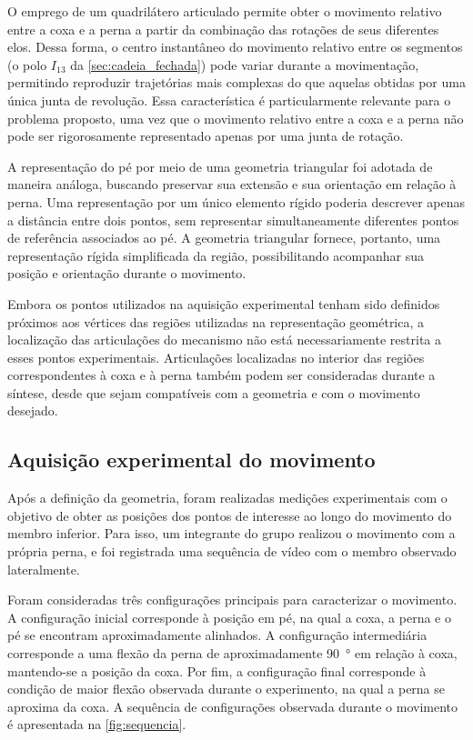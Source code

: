 \documentclass[12pt,a4paper,twoside]{article}
\numberwithin{equation}{section}
\begin{document}
O emprego de um quadrilátero articulado permite obter o movimento relativo entre a
coxa e a perna a partir da combinação das rotações de seus diferentes elos. Dessa
forma, o centro instantâneo do movimento relativo entre os segmentos (o polo $I_{13}$ da
\cref{sec:cadeia_fechada}) pode variar durante a movimentação, permitindo reproduzir
trajetórias mais complexas do que aquelas obtidas por uma única junta de revolução.
Essa característica é particularmente relevante para o problema proposto, uma vez que
o movimento relativo entre a coxa e a perna não pode ser rigorosamente representado
apenas por uma junta de rotação.

A representação do pé por meio de uma geometria triangular foi adotada de maneira
análoga, buscando preservar sua extensão e sua orientação em relação à perna. Uma
representação por um único elemento rígido poderia descrever apenas a distância entre
dois pontos, sem representar simultaneamente diferentes pontos de referência
associados ao pé. A geometria triangular fornece, portanto, uma representação rígida
simplificada da região, possibilitando acompanhar sua posição e orientação durante o
movimento.

Embora os pontos utilizados na aquisição experimental tenham sido definidos próximos
aos vértices das regiões utilizadas na representação geométrica, a localização das
articulações do mecanismo não está necessariamente restrita a esses pontos
experimentais. Articulações localizadas no interior das regiões correspondentes à coxa
e à perna também podem ser consideradas durante a síntese, desde que sejam compatíveis
com a geometria e com o movimento desejado.

\subsection{Aquisição experimental do movimento}\label{sec:aquisicao}

Após a definição da geometria, foram realizadas medições experimentais com o objetivo
de obter as posições dos pontos de interesse ao longo do movimento do membro inferior.
Para isso, um integrante do grupo realizou o movimento com a própria perna, e foi
registrada uma sequência de vídeo com o membro observado lateralmente.

Foram consideradas três configurações principais para caracterizar o movimento. A
configuração inicial corresponde à posição em pé, na qual a coxa, a perna e o pé se
encontram aproximadamente alinhados. A configuração intermediária corresponde a uma
flexão da perna de aproximadamente \SI{90}{\degree} em relação à coxa, mantendo-se a
posição da coxa. Por fim, a configuração final corresponde à condição de maior flexão
observada durante o experimento, na qual a perna se aproxima da coxa. A sequência de
configurações observada durante o movimento é apresentada na \cref{fig:sequencia}.
\end{document}
